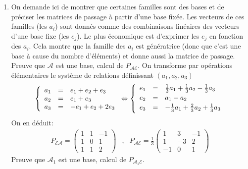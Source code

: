 \begin{enumerate}
 \item On demande ici de montrer que certaines familles sont des bases et de préciser les matrices de passage à partir d'une base fixée.
Les vecteurs de ces familles (les $a_i$) sont donnés comme des combinaisons linéaires des vecteurs d'une base fixe (les $e_j$). Le plus économique est d'exprimer les $e_j$ en fonction des $a_i$. Cela montre que la famille des $a_i$ est génératrice (donc que c'est une base à cause du nombre d'éléments) et donne aussi la matrice de passage.\newline
Preuve que $\mathcal A$ est une base, calcul de $P_{\mathcal{A}\mathcal{E}}$. \newline
On transforme par opérations élémentaires le système de relations définissant $(a_1,a_2,a_3)$
\begin{displaymath}
\left\lbrace \begin{array}{lll}
a_1 &=& e_1 + e_2 + e_3 \\
a_2 &=& e_1  + e_3 \\
a_3 &=& -e_1 + e_2 + 2e_3 \\
\end{array} \right. 
\Leftrightarrow
\left\lbrace \begin{array}{lll}
e_1 &=& \frac{1}{3}a_1 + \frac{1}{3}a_2 -\frac{1}{3} a_3 \vspace{2pt}\\
e_2 &=& a_1  - a_2 \vspace{2pt}\\
e_3 &=& -\frac{1}{3}a_1 + \frac{2}{3}a_2 + \frac{1}{3}a_3 \vspace{2pt}\\
\end{array} \right. 
\end{displaymath}
On en déduit:
\begin{align*}
 P_{\mathcal E \mathcal A }=
\begin{pmatrix}
 1& 1 & -1 \\
1& 0 &1 \\
1 & 1 & 2
\end{pmatrix}
 &,& 
 P_{\mathcal A \mathcal E }= \frac{1}{3}
\begin{pmatrix}
 1& 3 & -1 \\
1& -3 & 2 \\
-1 & 0 & 1
\end{pmatrix}
\end{align*}
Preuve que $\mathcal A_1$ est une base, calcul de $P_{\mathcal A_1 \mathcal E}$.\newline

\end{enumerate}
